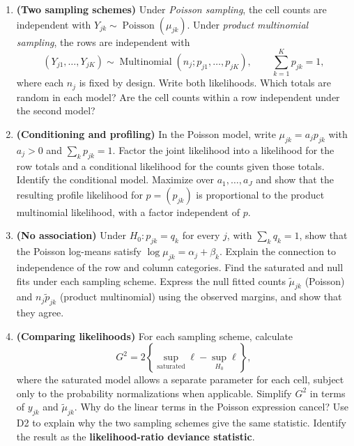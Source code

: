 \begin{enumerate}[label=\textcolor{AccentInk}{\sffamily\bfseries D\arabic*.},
                  ref=D\arabic*,leftmargin=2.65em,labelsep=0.65em,itemsep=1em]
\item \textbf{(Two sampling schemes)}
Under \emph{Poisson sampling}, the cell counts are independent with
$Y_{jk}\sim\operatorname{Poisson}(\mu_{jk})$.
Under \emph{product multinomial sampling}, the rows are independent with
\[
    (Y_{j1},\ldots,Y_{jK})
    \sim\operatorname{Multinomial}(n_j;p_{j1},\ldots,p_{jK}),
    \qquad \sum_{k=1}^K p_{jk}=1,
\]
where each $n_j$ is fixed by design. Write both likelihoods. Which totals are
random in each model? Are the cell counts within a row independent under the
second model?

\item \textbf{(Conditioning and profiling)}
In the Poisson model, write $\mu_{jk}=a_jp_{jk}$ with $a_j>0$ and
$\sum_kp_{jk}=1$. Factor the joint likelihood into a likelihood for the row
totals and a conditional likelihood for the counts given those totals.
Identify the conditional model. Maximize over $a_1,\ldots,a_J$ and show that
the resulting profile likelihood for $p=(p_{jk})$ is proportional to the
product multinomial likelihood, with a factor independent of $p$.

\item \textbf{(No association)}
Under $H_0:p_{jk}=q_k$ for every $j$, with $\sum_kq_k=1$, show that the
Poisson log-means satisfy $\log\mu_{jk}=\alpha_j+\beta_k$.
Explain the connection to independence of the row and column categories.
Find the saturated and null fits under each sampling scheme. Express the
null fitted counts $\widetilde\mu_{jk}$ (Poisson) and $n_j\widetilde p_{jk}$
(product multinomial) using the observed margins, and show that they agree.

\item \textbf{(Comparing likelihoods)}
For each sampling scheme, calculate
\[
    G^2=2\left\{\sup_{\mathrm{saturated}}\ell
                    -\sup_{H_0}\ell\right\},
\]
where the saturated model allows a separate parameter for each cell, subject
only to the probability normalizations when applicable. Simplify $G^2$ in
terms of $y_{jk}$ and $\widetilde\mu_{jk}$. Why do the linear terms in the
Poisson expression cancel? Use D2 to explain why the two sampling schemes
give the same statistic. Identify the result as the
\textbf{likelihood-ratio deviance statistic}.


\end{enumerate}
